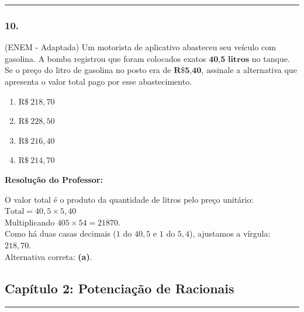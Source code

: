 \begin{multicols*}{2}
\par\vspace{\espacoQuestao}

\noindent\textcolor{CorLinha}{\rule{\linewidth}{0.5pt}} 
\par\vspace{\espacoPreQuestao}
\subsubsection*{10.} (ENEM - Adaptada) Um motorista de aplicativo abasteceu seu veículo com gasolina. A bomba registrou que foram colocados exatos $ \textbf{40,5 litros} $ no tanque. Se o preço do litro de gasolina no posto era de $ \textbf{R\$ 5,40} $, assinale a alternativa que apresenta o valor total pago por esse abastecimento.
\begin{enumerate}[label=\alph*), itemsep=\espacoAlt]
    \item $ \text{R\$} \ 218,70 $
    \item $ \text{R\$} \ 228,50 $
    \item $ \text{R\$} \ 216,40 $
    \item $ \text{R\$} \ 214,70 $
\end{enumerate}

\ifgabarito
    \begin{tcolorbox}[colback=CorTitUm!5, colframe=CorTitUm, boxrule=1pt, arc=4pt, left=6pt, right=6pt, top=6pt, bottom=6pt]
    \small\textbf{\textcolor{CorTitUm}{Resolução do Professor:}}\par\vspace{0.1cm}
    \color{CinzaEscuro}
    O valor total é o produto da quantidade de litros pelo preço unitário:\\
    $ \text{Total} = 40,5 \times 5,40 $\\
    Multiplicando $ 405 \times 54 = 21870 $.\\
    Como há duas casas decimais ($1$ do $40,5$ e $1$ do $5,4$), ajustamos a vírgula:\\
    $ 218,70 $.\\
    Alternativa correta: \textbf{(a)}.
    \end{tcolorbox}
\fi

\par\vspace{\espacoQuestao}

\subsection*{Capítulo 2: Potenciação de Racionais}
\vspace{-0.2cm}\noindent\rule{\linewidth}{1.5pt} 
\par\vspace{\espacoPosTitulo}

\end{multicols*}
